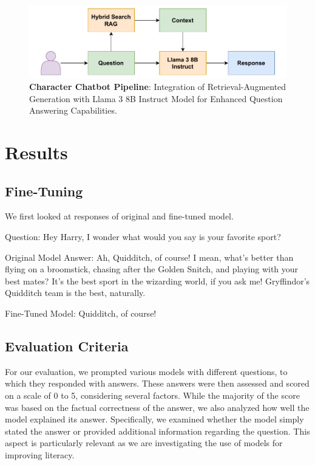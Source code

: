 \documentclass[fleqn,moreauthors,10pt]{ds_report}
\begin{document}
    \begin{figure}[!htb]
            \centering 
    	\includegraphics[width=\linewidth]{fig/new_chatbot.drawio.pdf}
    	\caption{\textbf{Character Chatbot Pipeline}: Integration of Retrieval-Augmented Generation with Llama 3 8B Instruct Model for Enhanced Question Answering Capabilities.}
    	\label{fig:qa_chatbot}
    \end{figure}


\section*{Results}

\subsection*{Fine-Tuning}

We first looked at responses of original and fine-tuned model.

Question: Hey Harry, I wonder what would you say is your favorite sport?

Original Model Answer: Ah, Quidditch, of course! I mean, what's better than flying on a broomstick, chasing after the Golden Snitch, and playing with your best mates? It's the best sport in the wizarding world, if you ask me! Gryffindor's Quidditch team is the best, naturally.

Fine-Tuned Model: Quidditch, of course!

\subsection*{Evaluation Criteria}

For our evaluation, we prompted various models with different questions, to which they responded with answers. These answers were then assessed and scored on a scale of 0 to 5, considering several factors. While the majority of the score was based on the factual correctness of the answer, we also analyzed how well the model explained its answer. Specifically, we examined whether the model simply stated the answer or provided additional information regarding the question. This aspect is particularly relevant as we are investigating the use of models for improving literacy.
\end{document}
